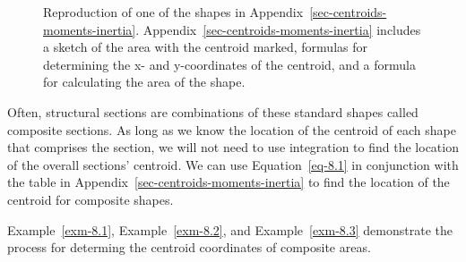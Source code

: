 \documentclass[
  letterpaper,
  DIV=11,
  numbers=noendperiod]{scrreprt}
\theoremstyle{definition}
\theoremstyle{remark}
\begin{document}
\begin{figure}


\caption{\label{fig-8.3}Reproduction of one of the shapes in
Appendix~\ref{sec-centroids-moments-inertia}.
Appendix~\ref{sec-centroids-moments-inertia} includes a sketch of the
area with the centroid marked, formulas for determining the x- and
y-coordinates of the centroid, and a formula for calculating the area of
the shape.}

\end{figure}%

Often, structural sections are combinations of these standard shapes
called composite sections. As long as we know the location of the
centroid of each shape that comprises the section, we will not need to
use integration to find the location of the overall sections' centroid.
We can use Equation~\ref{eq-8.1} in conjunction with the table in
Appendix~\ref{sec-centroids-moments-inertia} to find the location of the
centroid for composite shapes.

Example~\ref{exm-8.1}, Example~\ref{exm-8.2}, and Example~\ref{exm-8.3}
demonstrate the process for determing the centroid coordinates of
composite areas.
\end{document}
